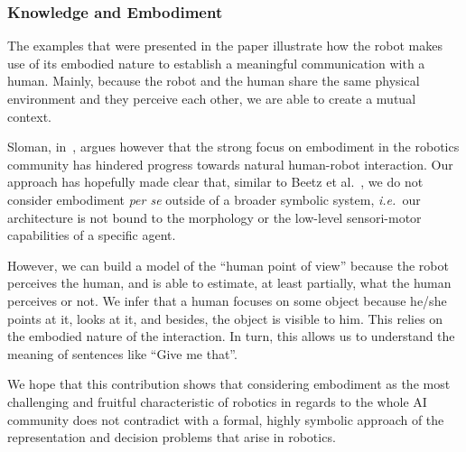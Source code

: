 \documentclass{svmult}
\newcommand{\ie}{{\textit{i.e.~}}}
\begin{document}
\subsubsection{Knowledge and Embodiment}

The examples that were presented in the paper illustrate how the
robot makes use of its embodied nature to establish a meaningful communication
with a human. Mainly, because the robot and the human share the same physical
environment and they perceive each other, we are able to create a mutual
context.

Sloman, in~\cite{Sloman2009}, argues however that the strong focus on
embodiment in the robotics community has hindered progress towards natural
human-robot interaction. Our approach has hopefully made clear that, similar to
Beetz et al.~\cite{Beetz2010}, we do not consider embodiment \emph{per se} outside of
a broader symbolic system, \ie our architecture is not bound to the morphology or
the low-level sensori-motor capabilities of a specific agent. 

However, we can build a model of the ``human point of view'' because the robot
perceives the human, and is able to estimate, at least partially, what the
human perceives or not. We infer that a human focuses on some object because
he/she points at it, looks at it, and besides, the object is visible to him.
This relies on the embodied nature of the interaction. In turn, this allows us
to understand the meaning of sentences like ``Give me that''.

We hope that this contribution shows that considering embodiment as the most
challenging and fruitful characteristic of robotics in regards to the whole AI
community does not contradict with a formal, highly symbolic approach of the
representation and decision problems that arise in robotics. 
\end{document}
